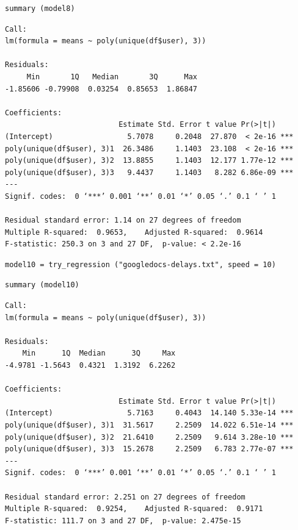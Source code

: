 \documentclass[10pt]{article}
\begin{document}
\begin{verbatim}
summary (model8)
\end{verbatim}

\begin{verbatim}
Call:
lm(formula = means ~ poly(unique(df$user), 3))

Residuals:
     Min       1Q   Median       3Q      Max 
-1.85606 -0.79908  0.03254  0.85653  1.86847 

Coefficients:
                          Estimate Std. Error t value Pr(>|t|)    
(Intercept)                 5.7078     0.2048  27.870  < 2e-16 ***
poly(unique(df$user), 3)1  26.3486     1.1403  23.108  < 2e-16 ***
poly(unique(df$user), 3)2  13.8855     1.1403  12.177 1.77e-12 ***
poly(unique(df$user), 3)3   9.4437     1.1403   8.282 6.86e-09 ***
---
Signif. codes:  0 ‘***’ 0.001 ‘**’ 0.01 ‘*’ 0.05 ‘.’ 0.1 ‘ ’ 1

Residual standard error: 1.14 on 27 degrees of freedom
Multiple R-squared:  0.9653,	Adjusted R-squared:  0.9614 
F-statistic: 250.3 on 3 and 27 DF,  p-value: < 2.2e-16
\end{verbatim}

\begin{verbatim}
model10 = try_regression ("googledocs-delays.txt", speed = 10)
\end{verbatim}

\begin{verbatim}
summary (model10)
\end{verbatim}

\begin{verbatim}
Call:
lm(formula = means ~ poly(unique(df$user), 3))

Residuals:
    Min      1Q  Median      3Q     Max 
-4.9781 -1.5643  0.4321  1.3192  6.2262 

Coefficients:
                          Estimate Std. Error t value Pr(>|t|)    
(Intercept)                 5.7163     0.4043  14.140 5.33e-14 ***
poly(unique(df$user), 3)1  31.5617     2.2509  14.022 6.51e-14 ***
poly(unique(df$user), 3)2  21.6410     2.2509   9.614 3.28e-10 ***
poly(unique(df$user), 3)3  15.2678     2.2509   6.783 2.77e-07 ***
---
Signif. codes:  0 ‘***’ 0.001 ‘**’ 0.01 ‘*’ 0.05 ‘.’ 0.1 ‘ ’ 1

Residual standard error: 2.251 on 27 degrees of freedom
Multiple R-squared:  0.9254,	Adjusted R-squared:  0.9171 
F-statistic: 111.7 on 3 and 27 DF,  p-value: 2.475e-15
\end{verbatim}
\end{document}
